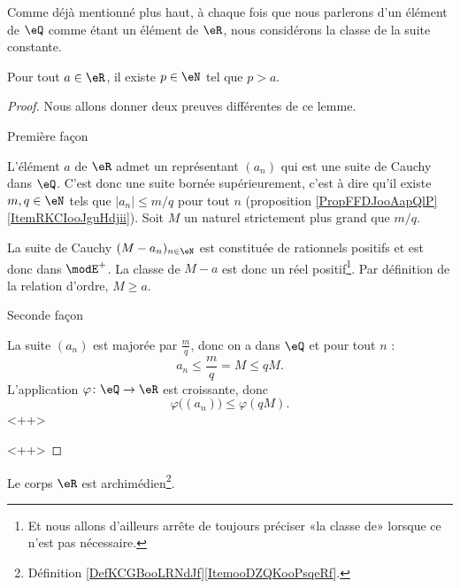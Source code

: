 \begin{remark}
    Comme déjà mentionné plus haut, à chaque fois que nous parlerons d'un élément de \( \eQ\) comme étant un élément de \( \eR\), nous considérons la classe de la suite constante.
\end{remark}

\begin{lemma}
    Pour tout \( a\in \eR\), il existe \( p\in \eN\) tel que \( p>a\). 
\end{lemma}

\begin{proof}
    Nous allons donner deux preuves différentes de ce lemme.
    \begin{subproof}
    \item[Première façon]
        
    L'élément \( a\) de \( \eR\) admet un représentant \( (a_n)\) qui est une suite de Cauchy dans \( \eQ\). C'est donc une suite bornée supérieurement, c'est à dire qu'il existe \( m,q\in \eN\) tels que \( | a_n |\leq m/q\) pour tout \( n\) (proposition \ref{PropFFDJooAapQlP}\ref{ItemRKCIooJguHdjii}). Soit \( M\) un naturel strictement plus grand que \( m/q\). 

    La suite de Cauchy \( (M-a_n)_{n\in \eN}\) est constituée de rationnels positifs et est donc dans \( \modE^+\). La classe de \( M-a\) est donc un réel positif\footnote{Et nous allons d'ailleurs arrête de toujours préciser «la classe de» lorsque ce n'est pas nécessaire.}. Par définition de la relation d'ordre, \( M\geq a\).
\item[Seconde façon]

    La suite \( (a_n)\) est majorée par \( \frac{ m }{ q }\), donc on a dans \( \eQ\) et pour tout \( n\) :
    \begin{equation}
        a_n\leq \frac{ m }{ q }=M\leq qM.
    \end{equation}
    L'application \( \varphi\colon \eQ\to \eR\) est croissante, donc
    \begin{equation}
        \varphi\big( (a_n) \big)\leq \varphi(qM).
    \end{equation}
    <++>
    \end{subproof}
    <++>
\end{proof}

\begin{theorem}
    Le corps \( \eR\) est archimédien\footnote{Définition \ref{DefKCGBooLRNdJf}\ref{ItemooDZQKooPsqeRf}.}.
\end{theorem}



